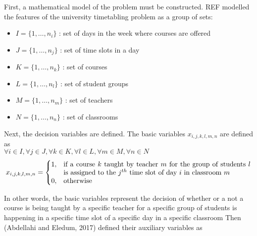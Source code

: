 \documentclass[a4paper, 12pt]{report}
\begin{document}
First, a mathematical model of the problem must be constructed. REF modelled 
the features of the university timetabling problem as a group of sets:
\begin{itemize}
	\item
		\begin{math}
			I = \{1, \dots , n_i\}
		\end{math}
		: set of days in the week where courses are offered
	\item
		\begin{math}
			J = \{1, \dots , n_j\}
		\end{math}
		: set of time slots in a day
	\item 
		\begin{math}
			K = \{1, \dots , n_k\}
		\end{math}
		: set of courses
	\item 
		\begin{math}
			L = \{1, \dots , n_l\}
		\end{math}
		: set of student groups
	\item 
		\begin{math}
			M = \{1, \dots , n_m\}
		\end{math}
		: set of teachers
	\item 
		\begin{math}
			N = \{1, \dots , n_n\}
		\end{math}
		: set of classrooms
\end{itemize}

Next, the decision variables are defined. The basic variables
\begin{math}
	x_{i,j,k,l,m,n}
\end{math}
are defined as \\
\begin{math}
	\forall i \in I, \forall j \in J, \forall k \in K, \forall l \in L, \forall
	m \in M, \forall n \in N
\end{math}
\begin{align*}
	x_{i,j,k,l,m,n} = 
	\begin{cases}
		1, & \parbox[t]{9.5cm}{if a course $k$ taught by teacher $m$ for the
		group of students $l$ is assigned to the $j^{th}$ time slot of day $i$
		in classroom $m$} \\
		0, & \text{otherwise}
	\end{cases}	
\end{align*}

In other words, the basic variables represent the decision of whether or a not
a course is being taught by a specific teacher for a specific group of students
is happening in a specific time slot of a specific day in a specific classroom
Then (Abdellahi and Eledum, 2017) defined their auxiliary variables as \\
\end{document}

